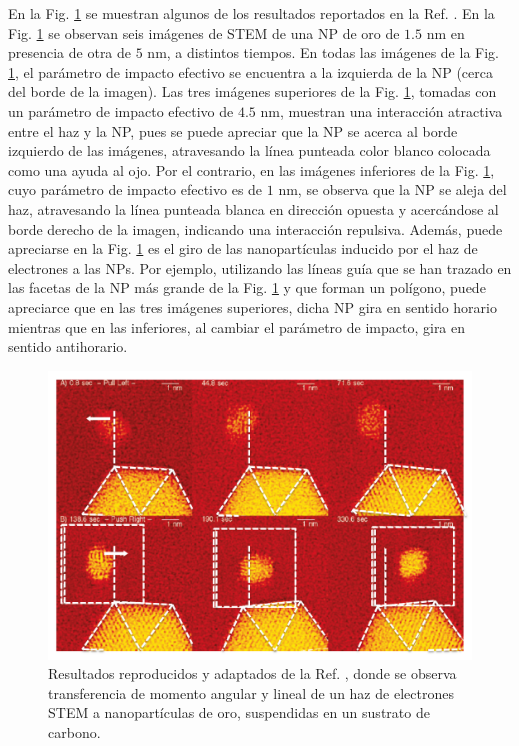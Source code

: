 \documentclass[letter,12pt]{article}
\numberwithin{equation}{section}
\begin{document}
En la Fig. \ref{fig: Batson momentum transfer} se muestran algunos de los resultados reportados en la Ref. \cite{Batson}. En la Fig. \ref{fig: Batson momentum transfer} se observan seis imágenes de STEM de una NP de oro de $1.5$ nm en presencia de otra de $5$ nm, a distintos tiempos. En todas las imágenes de la Fig. \ref{fig: Batson momentum transfer}, el parámetro de impacto efectivo se encuentra a la izquierda de la NP (cerca del borde de la imagen). Las tres imágenes superiores de la Fig. \ref{fig: Batson momentum transfer}, tomadas con un parámetro de impacto efectivo de $4.5$ nm, muestran una interacción atractiva entre el haz y la NP, pues se puede apreciar que la NP se acerca al borde izquierdo de las imágenes, atravesando la línea punteada color blanco colocada como una ayuda al ojo. Por el contrario, en las imágenes inferiores de la Fig. \ref{fig: Batson momentum transfer}, cuyo  parámetro de impacto efectivo es de $1$ nm,  se observa que la NP se aleja del haz, atravesando la línea punteada blanca en dirección opuesta y acercándose al borde derecho de la imagen, indicando una interacción repulsiva. Además, puede apreciarse en la Fig. \ref{fig: Batson momentum transfer} es el giro de las nanopartículas inducido por el haz de electrones a las NPs. Por ejemplo, utilizando las líneas guía que se han trazado en las facetas de la NP más grande de la Fig. \ref{fig: Batson momentum transfer} y que forman un polígono, puede apreciarce que en las tres imágenes superiores, dicha NP gira en sentido horario mientras que en las inferiores, al cambiar el parámetro de impacto, gira en sentido antihorario.

\begin{figure}[h!]
\centering
\includegraphics[width=0.6\linewidth]{17-imagenes/1-Intro/Batson}
\caption{\label{fig: Batson momentum transfer} Resultados reproducidos y adaptados de la Ref. \cite{Batson}, donde se observa transferencia de momento angular y lineal de un haz de electrones STEM a nanopartículas de oro, suspendidas en un sustrato de carbono.} 
\end{figure}
\end{document}
